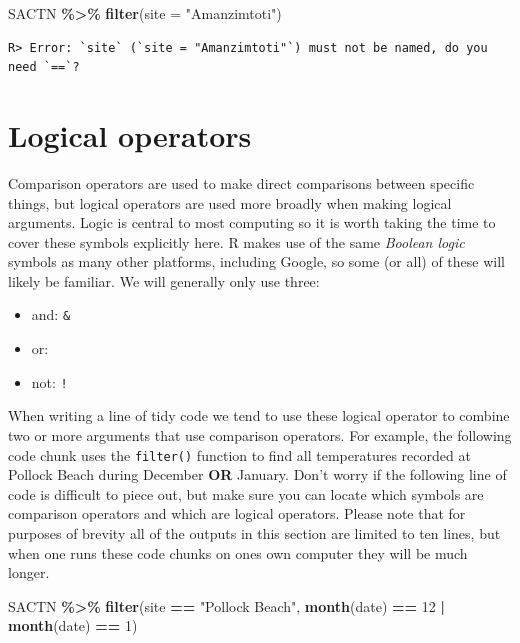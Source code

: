 \documentclass[
]{book}
\newenvironment{Shaded}{\begin{snugshade}}{\end{snugshade}}
\newcommand{\DataTypeTok}[1]{\textcolor[rgb]{0.13,0.29,0.53}{#1}}
\newcommand{\DecValTok}[1]{\textcolor[rgb]{0.00,0.00,0.81}{#1}}
\newcommand{\KeywordTok}[1]{\textcolor[rgb]{0.13,0.29,0.53}{\textbf{#1}}}
\newcommand{\NormalTok}[1]{#1}
\newcommand{\OperatorTok}[1]{\textcolor[rgb]{0.81,0.36,0.00}{\textbf{#1}}}
\newcommand{\StringTok}[1]{\textcolor[rgb]{0.31,0.60,0.02}{#1}}
\providecommand{\tightlist}{%
  \setlength{\itemsep}{0pt}\setlength{\parskip}{0pt}}
\begin{document}
\begin{Shaded}
\begin{Highlighting}[]
\NormalTok{SACTN }\OperatorTok{\%>\%}\StringTok{ }
\StringTok{  }\KeywordTok{filter}\NormalTok{(}\DataTypeTok{site =} \StringTok{"Amanzimtoti"}\NormalTok{)}
\end{Highlighting}
\end{Shaded}

\begin{verbatim}
R> Error: `site` (`site = "Amanzimtoti"`) must not be named, do you need `==`?
\end{verbatim}

\hypertarget{logical-operators}{%
\section{Logical operators}\label{logical-operators}}

Comparison operators are used to make direct comparisons between specific things, but logical operators are used more broadly when making logical arguments. Logic is central to most computing so it is worth taking the time to cover these symbols explicitly here. R makes use of the same \emph{Boolean logic} symbols as many other platforms, including Google, so some (or all) of these will likely be familiar. We will generally only use three:

\begin{itemize}
\tightlist
\item
  and: \texttt{\&}\\
\item
  or: \texttt{\textbar{}}\\
\item
  not: \texttt{!}
\end{itemize}

When writing a line of tidy code we tend to use these logical operator to combine two or more arguments that use comparison operators. For example, the following code chunk uses the \texttt{filter()} function to find all temperatures recorded at Pollock Beach during December \textbf{OR} January. Don't worry if the following line of code is difficult to piece out, but make sure you can locate which symbols are comparison operators and which are logical operators. Please note that for purposes of brevity all of the outputs in this section are limited to ten lines, but when one runs these code chunks on ones own computer they will be much longer.

\begin{Shaded}
\begin{Highlighting}[]
\NormalTok{SACTN }\OperatorTok{\%>\%}\StringTok{ }
\StringTok{  }\KeywordTok{filter}\NormalTok{(site }\OperatorTok{==}\StringTok{ "Pollock Beach"}\NormalTok{, }\KeywordTok{month}\NormalTok{(date) }\OperatorTok{==}\StringTok{ }\DecValTok{12} \OperatorTok{|}\StringTok{ }\KeywordTok{month}\NormalTok{(date) }\OperatorTok{==}\StringTok{ }\DecValTok{1}\NormalTok{)}
\end{Highlighting}
\end{Shaded}
\end{document}
